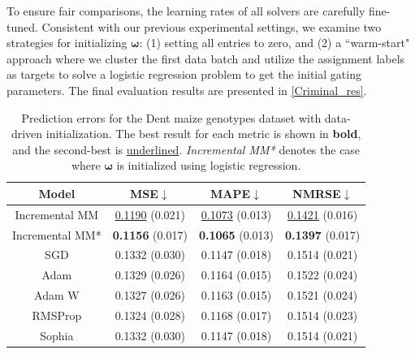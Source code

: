 \documentclass{article}
\def\vomega{{\bm{\omega}}}
\begin{document}
To ensure fair comparisons, the learning rates of all solvers are carefully fine-tuned. Consistent with our previous experimental settings, we examine two strategies for initializing $\vomega$: (1) setting all entries to zero, and (2) a ``warm-start" approach where we cluster the first data batch and utilize the assignment labels as targets to solve a logistic regression problem to get the initial gating parameters. The final evaluation results are presented in \cref{Criminal_res}.

\begin{table}[H]
\centering
\caption{Prediction errors for the Dent maize genotypes dataset with data-driven initialization. The best result for each metric is shown in \textbf{bold}, and the second-best is \underline{underlined}. \textit{Incremental MM*} denotes the case where $\vomega$ is initialized using logistic regression.}
\vspace{0.3em}
\label{tab_maize_genotypes}
\begin{tabular}{|c|c|c|c|}
\toprule
\textbf{Model} & \textbf{MSE$\downarrow$} & \textbf{MAPE$\downarrow$} & \textbf{NMRSE$\downarrow$} \\
\midrule
Incremental MM & \underline{0.1190} (0.021) & \underline{0.1073} (0.013) & \underline{0.1421} (0.016) \\
Incremental MM* & \textbf{0.1156} (0.017) & \textbf{0.1065} (0.013) & \textbf{0.1397} (0.017) \\
SGD       & 0.1332 (0.030) & 0.1147 (0.018) & 0.1514 (0.021) \\
Adam      & 0.1329 (0.026) & 0.1164 (0.015) & 0.1522 (0.024) \\
Adam W    & 0.1327 (0.026) & 0.1163 (0.015) & 0.1521 (0.024) \\
RMSProp   & 0.1324 (0.028) & 0.1168 (0.017) & 0.1514 (0.023) \\
Sophia    & 0.1332 (0.030) & 0.1147 (0.018) & 0.1514 (0.021) \\
\bottomrule
\end{tabular}
\end{table}
\end{document}
